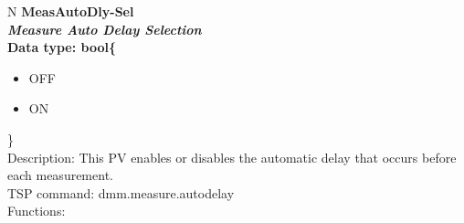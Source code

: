 \documentclass[openany]{article}
\begin{document}
		\begin{tabular}{N}
			\hline
			\bfseries MeasAutoDly-Sel\label{pv:measautodly-sel} \\ \hline
			\emph{Measure Auto Delay Selection} \\
			Data type: bool\{\begin{itemize}[noitemsep]
				\small
				\item[] OFF
				\item[] ON
			\end{itemize}\} \\
			Description: This PV enables or disables the automatic delay that occurs before each measurement. \\
			TSP command: dmm.measure.autodelay \\
			Functions: \\
			\arrayrulecolor{\FuncTableBorderColor}

		\end{tabular}
\end{document}
